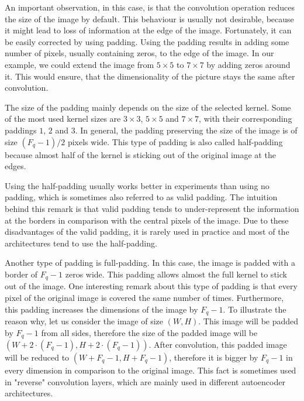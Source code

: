 An important observation, in this case, is that the convolution operation reduces the size of the image by default.
This behaviour is usually not desirable, because it might lead to loss of information at the edge of the image.
Fortunately, it can be easily corrected by using padding.
Using the padding results in adding some number of pixels, usually containing zeros, to the edge of the image.
In our example, we could extend the image from $5 \times 5$ to $7 \times 7$ by adding zeros around it.
This would ensure, that the dimensionality of the picture stays the same after convolution.

The size of the padding mainly depends on the size of the selected kernel.
Some of the most used kernel sizes are $3 \times 3$, $5 \times 5$ and $7 \times 7$, with their corresponding paddings $1$, $2$ and $3$.
In general, the padding preserving the size of the image is of size $(F_q - 1)/2$ pixels wide.
This type of padding is also called half-padding because almost half of the kernel is sticking out of the original image at the edges.

Using the half-padding usually works better in experiments than using no padding, which is sometimes also referred to as valid padding.
The intuition behind this remark is that valid padding tends to under-represent the information at the borders in comparison with the central pixels of the image.
Due to these disadvantages of the valid padding, it is rarely used in practice and most of the architectures tend to use the half-padding.

Another type of padding is full-padding.
In this case, the image is padded with a border of $F_q - 1$ zeros wide.
This padding allows almost the full kernel to stick out of the image.
One interesting remark about this type of padding is that every pixel of the original image is covered the same number of times.
Furthermore, this padding increases the dimensions of the image by $F_q - 1$.
To illustrate the reason why, let us consider the image of size $(W, H)$.
This image will be padded by $F_q - 1$ from all sides, therefore the size of the padded image will be $(W + 2\cdot(F_q - 1), H + 2\cdot(F_q - 1))$.
After convolution, this padded image will be reduced to $(W + F_q - 1, H + F_q - 1)$, therefore it is bigger by $F_q - 1$ in every dimension in comparison to the original image.
This fact is sometimes used in "reverse" convolution layers, which are mainly used in different autoencoder architectures.


